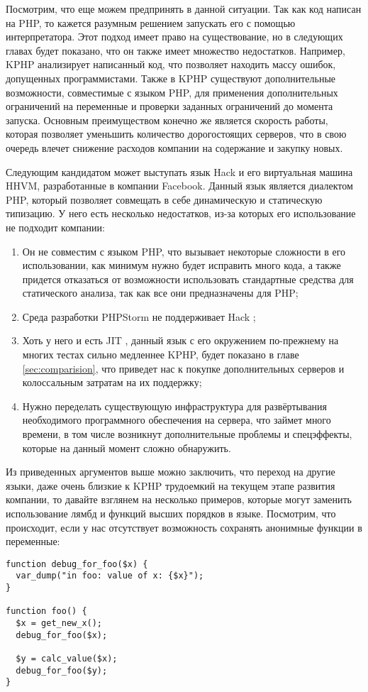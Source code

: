 Посмотрим, что еще можем предпринять в данной ситуации. 
Так как код написан на PHP, то кажется разумным решением запускать его с помощью интерпретатора.
Этот подход имеет право на существование, но в следующих главах будет показано, что он также имеет множество недостатков.
Например, KPHP анализирует написанный код, что позволяет находить массу ошибок, допущенных программистами.
Также в KPHP существуют дополнительные возможности, совместимые с языком PHP, для применения дополнительных ограничений на переменные и проверки заданных ограничений до момента запуска.
Основным преимуществом конечно же является скорость работы, которая позволяет уменьшить количество дорогостоящих серверов, что в свою очередь влечет снижение расходов компании на содержание и закупку новых.

Следующим кандидатом может выступать язык Hack и его виртуальная машина HHVM, разработанные в компании Facebook.
Данный язык является диалектом PHP, который позволяет совмещать в себе динамическую и статическую типизацию.
У него есть несколько недостатков, из-за которых его использование не подходит компании:

\begin{enumerate}
\item Он не совместим с языком PHP, что вызывает некоторые сложности в его использовании, как минимум нужно будет исправить много кода, а также придется отказаться от возможности использовать стандартные средства для статического анализа, так как все они предназначены для PHP;

\item Среда разработки PHPStorm не поддерживает Hack \cite{hack-postponed};

\item Хоть у него и есть JIT \cite{hack-jit}, данный язык с его окружением по-прежнему на многих тестах сильно медленнее KPHP, будет показано в главе \ref{sec:comparision}, что приведет нас к покупке дополнительных серверов и колоссальным затратам на их поддержку;

\item Нужно переделать существующую инфраструктура для развёртывания необходимого программного обеспечения на сервера, что займет много времени, в том числе возникнут дополнительные проблемы и спецэффекты, которые на данный момент сложно обнаружить.
\end{enumerate}

Из приведенных аргументов выше можно заключить, что переход на другие языки, даже очень близкие к KPHP трудоемкий на текущем этапе развития компании, то давайте взглянем на несколько примеров, которые могут заменить использование лямбд и функций высших порядков в языке.
Посмотрим, что происходит, если у нас отсутствует возможность сохранять анонимные функции в переменные:
\begin{lstlisting}[caption={Пример кода без анонимных функций},label={without_lambda}]
function debug_for_foo($x) {
  var_dump("in foo: value of x: {$x}");
}

function foo() {
  $x = get_new_x();
  debug_for_foo($x);

  $y = calc_value($x);
  debug_for_foo($y);
}
\end{lstlisting}

